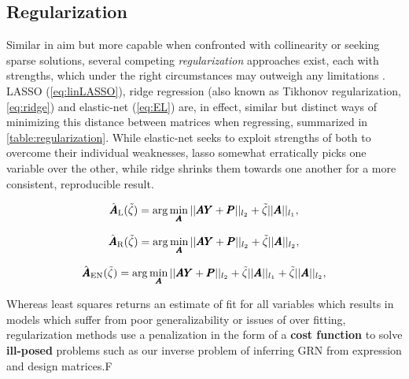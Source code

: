 \subsection{Regularization}
\label{sec:reg}
Similar in aim but more capable when confronted with collinearity or seeking sparse solutions, several competing \emph{regularization} approaches exist, each with strengths, which under the right circumstances may outweigh any limitations \cite[p.69-73,661-668]{friedman2001elements}. LASSO (\cref{eq:linLASSO}), ridge regression (also known as Tikhonov regularization, \cref{eq:ridge}) and elastic-net (\cref{eq:EL}) are, in effect, similar but distinct ways of minimizing this distance between matrices when regressing, summarized in \cref{table:regularization}. While elastic-net seeks to exploit strengths of both to overcome their individual weaknesses, lasso somewhat erratically picks one variable over the other, while ridge shrinks them towards one another for a more consistent, reproducible result.

 \begin{equation}\label{eq:linLASSO}
  \hat{{\pmb{A}}}_{\textrm{L}}(\tilde{\zeta}) = \arg \min_{{\pmb{A}}} ||{\pmb{A}} {\pmb{Y}}+{\pmb{P}}||_{l_2} + \tilde{\zeta} ||{\pmb{A}}||_{l_1},
\end{equation}

 \begin{equation}\label{eq:ridge}
  \hat{{\pmb{A}}}_{\textrm{R}}(\tilde{\zeta}) = \arg \min_{{\pmb{A}}} ||{\pmb{A}} {\pmb{Y}}+{\pmb{P}}||_{l_2} + \tilde{\zeta} ||{\pmb{A}}||_{l_2},
\end{equation}

 \begin{equation}\label{eq:EL}
  \hat{{\pmb{A}}}_{\textrm{EN}}(\tilde{\zeta}) = \arg \min_{{\pmb{A}}} ||{\pmb{A}} {\pmb{Y}}+{\pmb{P}}||_{l_2} + \tilde{\zeta} ||{\pmb{A}}||_{l_1}+ \tilde{\zeta} ||{\pmb{A}}||_{l_2},
\end{equation}

Whereas least squares returns an estimate of fit for all variables which results in models which suffer from poor generalizability or issues of over fitting, regularization methods use a penalization in the form of a \textbf{cost function} to solve \textbf{ill-posed} problems such as our inverse problem of inferring GRN from expression and design matrices.F

